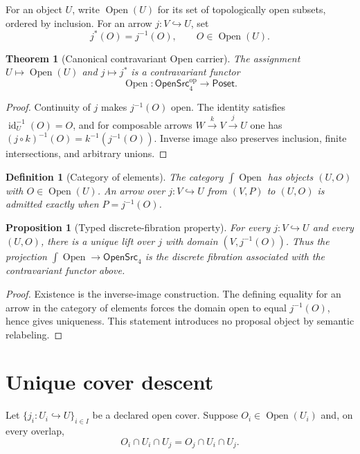 \documentclass[11pt]{article}
\newtheorem{theorem}{Theorem}
\newtheorem{proposition}{Proposition}
\newtheorem{definition}{Definition}
\begin{document}
For an object $U$, write $\operatorname{Open}(U)$ for its set of topologically
open subsets, ordered by inclusion.  For an arrow $j:V\hookrightarrow U$, set
\[
  j^{*}(O)=j^{-1}(O),\qquad O\in\operatorname{Open}(U).
\]

\begin{theorem}[Canonical contravariant Open carrier]
The assignment $U\mapsto\operatorname{Open}(U)$ and
$j\mapsto j^{*}$ is a contravariant functor
\[
  \operatorname{Open}:\mathsf{OpenSrc}_4^{\mathrm{op}}
  \longrightarrow \mathsf{Poset}.
\]
\end{theorem}

\begin{proof}
Continuity of $j$ makes $j^{-1}(O)$ open.  The identity satisfies
$\operatorname{id}_{U}^{-1}(O)=O$, and for composable arrows
$W\xrightarrow{k}V\xrightarrow{j}U$ one has
$(j\circ k)^{-1}(O)=k^{-1}(j^{-1}(O))$.  Inverse image also preserves
inclusion, finite intersections, and arbitrary unions.
\end{proof}

\begin{definition}[Category of elements]
The category $\int\!\operatorname{Open}$ has objects $(U,O)$ with
$O\in\operatorname{Open}(U)$.  An arrow over $j:V\hookrightarrow U$ from
$(V,P)$ to $(U,O)$ is admitted exactly when $P=j^{-1}(O)$.
\end{definition}

\begin{proposition}[Typed discrete-fibration property]
For every $j:V\hookrightarrow U$ and every $(U,O)$, there is a unique lift over
$j$ with domain $(V,j^{-1}(O))$.  Thus the projection
$\int\!\operatorname{Open}\to\mathsf{OpenSrc}_4$ is the discrete fibration
associated with the contravariant functor above.
\end{proposition}

\begin{proof}
Existence is the inverse-image construction.  The defining equality for an
arrow in the category of elements forces the domain open to equal
$j^{-1}(O)$, hence gives uniqueness.  This statement introduces no proposal
object by semantic relabeling.
\end{proof}

\section{Unique cover descent}

Let $\{j_i:U_i\hookrightarrow U\}_{i\in I}$ be a declared open cover.  Suppose
$O_i\in\operatorname{Open}(U_i)$ and, on every overlap,
\[
  O_i\cap U_i\cap U_j=O_j\cap U_i\cap U_j.
\]
\end{document}
